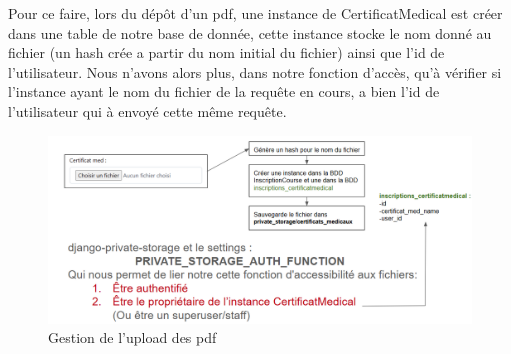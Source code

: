 \documentclass[12pt]{article} %
\begin{document}
Pour ce faire, lors du dépôt d'un pdf, une instance de CertificatMedical est créer dans une table de notre base de donnée, cette instance stocke le nom donné au fichier (un hash crée a partir du nom initial du fichier) ainsi que l'id de l'utilisateur. Nous n'avons alors plus, dans notre fonction d'accès, qu'à vérifier si l'instance ayant le nom du fichier de la requête en cours, a bien l'id de l'utilisateur qui à envoyé cette même requête.


\begin{figure}[!h]
		\begin{center}
			\includegraphics[scale=0.5]{images/gestionUpload}
			\caption{Gestion de l'upload des pdf}
		\end{center}
	\end{figure}
		
		
\end{document}
